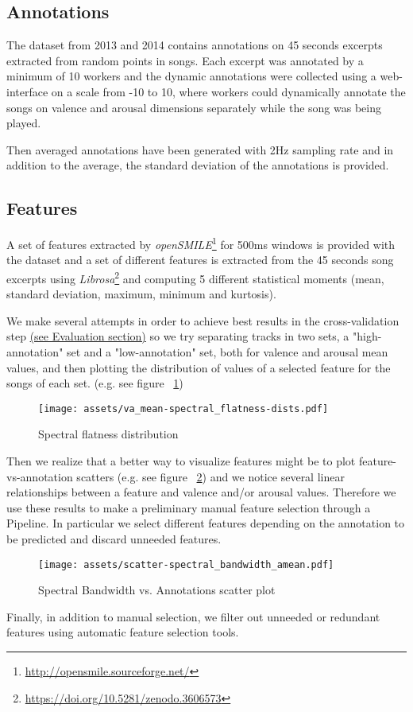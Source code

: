 \subsection{Annotations}

The dataset from 2013 and 2014 contains annotations on 45 seconds excerpts extracted from random points in songs. Each excerpt was annotated by a minimum of 10 workers and the dynamic annotations were collected using a web-interface on a scale from -10 to 10, where workers could dynamically annotate the songs on valence and arousal dimensions separately while the song was being played.~\cite{aljanaki2017developing}

Then averaged annotations have been generated with 2Hz sampling rate and in addition to the average, the standard deviation of the annotations is provided.~\cite{soleymani2016deam}


\subsection{Features}

A set of features extracted by \emph{openSMILE}\footnote{\url{http://opensmile.sourceforge.net/}} for 500ms windows is provided with the dataset and a set of different features is extracted from the 45 seconds song excerpts using \emph{Librosa}\footnote{\url{https://doi.org/10.5281/zenodo.3606573}} and computing 5 different statistical moments (mean, standard deviation, maximum, minimum and kurtosis).

We make several attempts in order to achieve best results in the cross-validation step \hyperref[sec:evaluation]{(see Evaluation section)} so we try separating tracks in two sets, a "high-annotation" set and a "low-annotation" set, both for valence and arousal mean values, and then plotting the distribution of values of a selected feature for the songs of each set. (e.g. see figure ~\ref{fig:va_mean-spectral_flatness-dists})

\begin{figure}[h]
	\centering
	\texttt{[image: assets/va\_mean-spectral\_flatness-dists.pdf]}
	\caption{Spectral flatness distribution}
	\label{fig:va_mean-spectral_flatness-dists}
\end{figure}

Then we realize that a better way to visualize features might be to plot feature-vs-annotation scatters (e.g. see figure ~\ref{fig:scatter-spectral_bandwidth_amean}) and we notice several linear relationships between a feature and valence and/or arousal values. Therefore we use these results to make a preliminary manual feature selection through a Pipeline. In particular we select different features depending on the annotation to be predicted and discard unneeded features.

\begin{figure}
	\centering
	\texttt{[image: assets/scatter-spectral\_bandwidth\_amean.pdf]}
	\caption{Spectral Bandwidth vs. Annotations scatter plot}
	\label{fig:scatter-spectral_bandwidth_amean}
\end{figure}

Finally, in addition to manual selection, we filter out unneeded or redundant features using automatic feature selection tools.